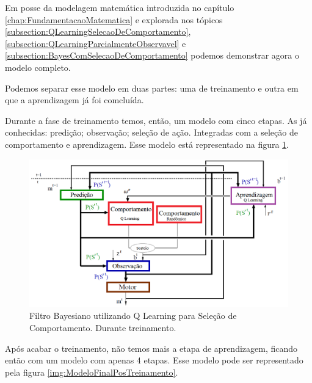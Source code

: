 Em posse da modelagem matemática introduzida no capítulo \ref{chap:FundamentacaoMatematica} e explorada nos tópicos \ref{subsection:QLearningSelecaoDeComportamento}, \ref{subsection:QLearningParcialmenteObservavel} e \ref{subsection:BayesComSelecaoDeComportamento} podemos demonstrar agora o modelo completo.

Podemos separar esse modelo em duas partes: uma de treinamento e outra em que a aprendizagem já foi comcluída.

Durante a fase de treinamento temos, então, um modelo com cinco etapas. As já conhecidas: predição; observação; seleção de ação. Integradas com a seleção de comportamento e aprendizagem. Esse modelo está representado na figura \ref{img:ModeloFinalTreinamento}.

\begin{figure}[H]
    \centering
    \includegraphics[width=150mm]{images/modelo_bayesiano_treino-tiago}
    \caption{\label{img:ModeloFinalTreinamento}Filtro Bayesiano utilizando Q Learning para Seleção de Comportamento. Durante treinamento.}
\end{figure}

Após acabar o treinamento, não temos mais a etapa de aprendizagem, ficando então com um modelo com apenas 4 etapas. Esse modelo pode ser representado pela figura \ref{img:ModeloFinalPosTreinamento}.

